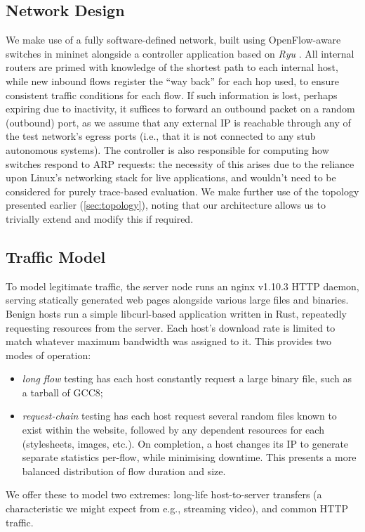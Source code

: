 \documentclass[conference, letterpaper, 10pt, times]{IEEEtran}
\begin{document}
\subsection{Network Design}
We make use of a fully software-defined network, built using OpenFlow-aware switches in mininet alongside a controller application based on \emph{Ryu} \cite{ryu}.
All internal routers are primed with knowledge of the shortest path to each internal host, while new inbound flows register the ``way back'' for each hop used, to ensure consistent traffic conditions for each flow.
If such information is lost, perhaps expiring due to inactivity, it suffices to forward an outbound packet on a random (outbound) port, as we assume that any external IP is reachable through any of the test network's egress ports (i.e., that it is not connected to any stub autonomous systems).
The controller is also responsible for computing how switches respond to ARP requests: the necessity of this arises due to the reliance upon Linux's networking stack for live applications, and wouldn't need to be considered for purely trace-based evaluation.
We make further use of the topology presented earlier (\cref{sec:topology}), noting that our architecture allows us to trivially extend and modify this if required.

\subsection{Traffic Model}
To model legitimate traffic, the server node runs an nginx v1.10.3 HTTP daemon, serving statically generated web pages alongside various large files and binaries.
Benign hosts run a simple libcurl-based application written in Rust, repeatedly requesting resources from the server.
Each host's download rate is limited to match whatever maximum bandwidth was assigned to it.
This provides two modes of operation:
\begin{itemize}
	\item \emph{long flow} testing has each host constantly request a large binary file, such as a tarball of GCC8;
	\item \emph{request-chain} testing has each host request several random files known to exist within the website, followed by any dependent resources for each (stylesheets, images, etc.). On completion, a host changes its IP to generate separate statistics per-flow, while minimising downtime. This presents a more balanced distribution of flow duration and size.
\end{itemize}
We offer these to model two extremes: long-life host-to-server transfers (a characteristic we might expect from e.g., streaming video), and common HTTP traffic.
\end{document}

